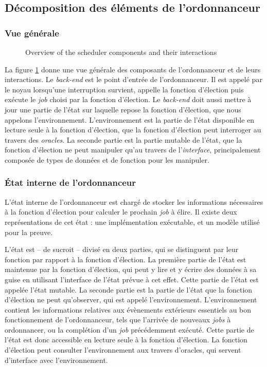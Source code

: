 		\subsection{Décomposition des éléments de l'ordonnanceur}
			\subsubsection{Vue générale}
			\begin{figure}[!ht]
			    \centering
			    
			    \caption{Overview of the scheduler components and their interactions}
			    \label{fig:project_overview}
			\end{figure}


			La figure \ref{fig:project_overview} donne une vue générale des composants de l'ordonnanceur et de leurs interactions. Le \emph{back-end} est le point d'entrée de l'ordonnanceur. Il est appelé par le noyau lorsqu'une interruption survient, appelle la fonction d'élection puis exécute le \emph{job} choisi par la fonction d'élection. Le \emph{back-end} doit aussi mettre à jour une partie de l'état sur laquelle repose la fonction d'élection, que nous appelons l'environnement. L'environnement est la partie de l'état disponible en lecture seule à la fonction d'élection, que la fonction d'élection peut interroger au travers des \emph{oracles}. La seconde partie est la partie mutable de l'état, que la fonction d'élection ne peut manipuler qu'au travers de l'\emph{interface}, principalement composée de types de données et de fonction pour les manipuler.

		\subsubsection{État interne de l'ordonnanceur}

			L'état interne de l'ordonnanceur est chargé de stocker les informations nécessaires à la fonction d'élection pour calculer le prochain \emph{job} à élire. Il existe deux représentations de cet état : une implémentation exécutable, et un modèle utilisé pour la preuve.

			L'état est -- de sucroit -- divisé en deux parties, qui se distinguent par leur fonction par rapport à la fonction d'élection. La première partie de l'état est maintenue par la fonction d'élection, qui peut y lire et y écrire des données à sa guise en utilisant l'interface de l'état prévue à cet effet. Cette partie de l'état est appelée l'état mutable. La seconde partie est la partie de l'état que la fonction d'élection ne peut qu'observer, qui est appelé l'environnement. L'environnement contient les informations relatives aux évènements extérieurs essentiels au bon fonctionnement de l'ordonnanceur, tels que l'arrivée de nouveaux \emph{jobs} à ordonnancer, ou la complétion d'un \emph{job} précédemment exécuté. Cette partie de l'état est donc accessible en lecture seule à la fonction d'élection. La fonction d'élection peut consulter l'environnement aux travers d'oracles, qui servent d'interface avec l'environnement.

